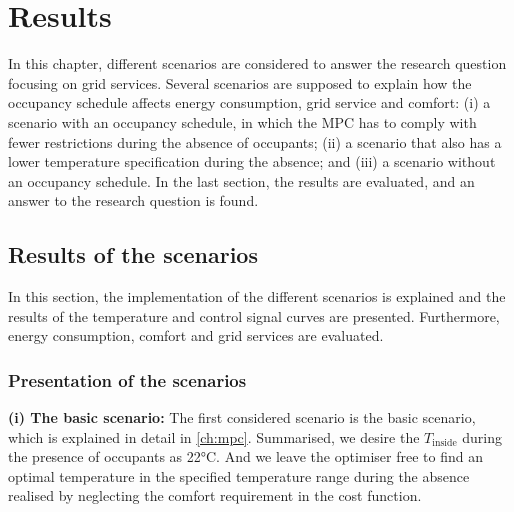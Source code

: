 \chapter{Results}
\label{ch:results}
In this chapter, different scenarios are considered to answer the research question focusing on grid services. Several scenarios are supposed to explain how the occupancy schedule affects energy consumption, grid service and comfort: (i) a scenario with an occupancy schedule, in which the MPC has to comply with fewer restrictions during the absence of occupants; (ii) a scenario that also has a lower temperature specification during the absence; and (iii) a scenario without an occupancy schedule. In the last section, the results are evaluated, and an answer to the research question is found.

\section{Results of the scenarios}
\label{sec:ResultsScenarios}
In this section, the implementation of the different scenarios is explained and the results of the temperature and control signal curves are presented. Furthermore, energy consumption, comfort and grid services are evaluated.  

\subsection{Presentation of the scenarios}
\label{subsec:Presentation of the scenarios}

\textbf{(i) The basic scenario:}\newline
The first considered scenario is the basic scenario, which is explained in detail in \autoref{ch:mpc}. Summarised, we desire the $T_\text{inside}$ during the presence of occupants as 22°C. And we leave the optimiser free to find an optimal temperature in the specified temperature range during the absence realised by neglecting the comfort requirement in the cost function.\newline

